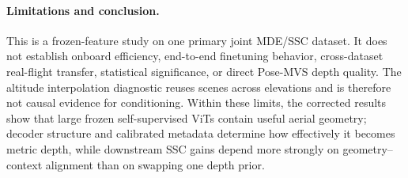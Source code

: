 \paragraph{Limitations and conclusion.}
This is a frozen-feature study on one primary joint MDE/SSC dataset. It does not establish onboard efficiency, end-to-end finetuning behavior, cross-dataset real-flight transfer, statistical significance, or direct Pose-MVS depth quality. The altitude interpolation diagnostic reuses scenes across elevations and is therefore not causal evidence for conditioning. Within these limits, the corrected results show that large frozen self-supervised ViTs contain useful aerial geometry; decoder structure and calibrated metadata determine how effectively it becomes metric depth, while downstream SSC gains depend more strongly on geometry--context alignment than on swapping one depth prior.
